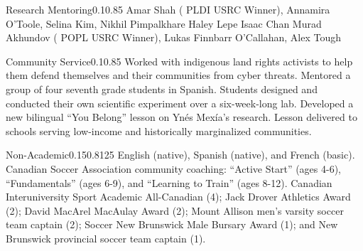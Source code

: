 \documentclass{federico_cv}
\begin{document}
\begin{tblSection}{Research Mentoring}{0.1}{0.85}
{Amar Shah (
{PLDI  USRC Winner}), Annamira O'Toole, Selina Kim, Nikhil Pimpalkhare}
{Haley Lepe}
{Isaac Chan}
{Murad Akhundov
(
{POPL  USRC Winner}), Lukas Finnbarr O'Callahan, Alex Tough}
\end{tblSection}

\begin{tblSection}{Community Service}{0.1}{0.85}
{Worked with indigenous land rights activists to help them defend themselves and their communities from cyber threats.}
{Mentored a group of four seventh grade students in Spanish.}
{Students designed and conducted their own scientific experiment over a six-week-long lab.}
{Developed a new bilingual ``You Belong'' lesson on Ynés Mexía's research.} 
{Lesson delivered to schools serving low-income and historically marginalized communities.}
\end{tblSection}

\begin{tblSection}{Non-Academic}{0.15}{0.8125}
{English (native), Spanish (native), and French (basic).}
{Canadian Soccer Association community coaching: ``Active Start'' (ages 4-6), 
``Fundamentals'' (ages 6-9), and ``Learning to Train'' (ages 8-12).}
{Canadian Interuniversity Sport Academic All-Canadian (4); Jack Drover Athletics 
Award (2); David MacArel MacAulay Award (2); Mount Allison men's varsity soccer 
team captain (2); Soccer New Brunswick Male Bursary Award (1); and New Brunswick 
provincial soccer team captain (1).}
\end{tblSection}
\end{document}
